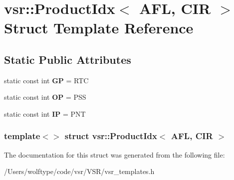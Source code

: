 \hypertarget{structvsr_1_1_product_idx_3_01_a_f_l_00_01_c_i_r_01_4}{\section{vsr\-:\-:Product\-Idx$<$ A\-F\-L, C\-I\-R $>$ Struct Template Reference}
\label{structvsr_1_1_product_idx_3_01_a_f_l_00_01_c_i_r_01_4}
}
\subsection*{Static Public Attributes}
\begin{DoxyCompactItemize}
\item 
\hypertarget{structvsr_1_1_product_idx_3_01_a_f_l_00_01_c_i_r_01_4_a213f823896355abf7ade78d59afbfddb}{static const int {\bfseries G\-P} = R\-T\-C}\label{structvsr_1_1_product_idx_3_01_a_f_l_00_01_c_i_r_01_4_a213f823896355abf7ade78d59afbfddb}

\item 
\hypertarget{structvsr_1_1_product_idx_3_01_a_f_l_00_01_c_i_r_01_4_a5fd981c4bb24c3937c7c919c4fd1e78f}{static const int {\bfseries O\-P} = P\-S\-S}\label{structvsr_1_1_product_idx_3_01_a_f_l_00_01_c_i_r_01_4_a5fd981c4bb24c3937c7c919c4fd1e78f}

\item 
\hypertarget{structvsr_1_1_product_idx_3_01_a_f_l_00_01_c_i_r_01_4_a63c902a943c1eb77e940b0ad74fcbc13}{static const int {\bfseries I\-P} = P\-N\-T}\label{structvsr_1_1_product_idx_3_01_a_f_l_00_01_c_i_r_01_4_a63c902a943c1eb77e940b0ad74fcbc13}

\end{DoxyCompactItemize}
\subsubsection*{template$<$$>$ struct vsr\-::\-Product\-Idx$<$ A\-F\-L, C\-I\-R $>$}



The documentation for this struct was generated from the following file\-:\begin{DoxyCompactItemize}
\item 
/\-Users/wolftype/code/vsr/\-V\-S\-R/vsr\-\_\-templates.\-h\end{DoxyCompactItemize}

